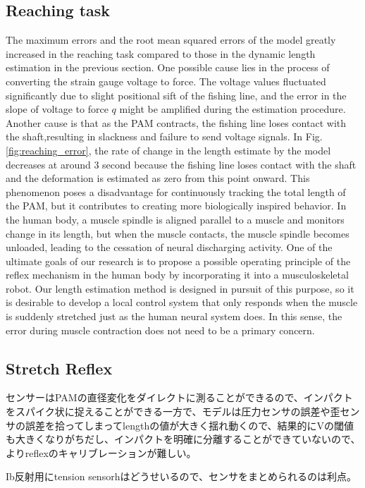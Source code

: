 \subsection{Reaching task}
The maximum errors and the root mean squared errors of the model greatly increased in the reaching task compared to those in the dynamic length estimation in the previous section. One possible cause lies in the process of converting the strain gauge voltage to force. The voltage values fluctuated significantly due to slight positional sift of the fishing line, and the error in the slope of voltage to force $q$ might be amplified during the estimation procedure. Another cause is that as the PAM contracts, the fishing line loses contact with the shaft,resulting in slackness and failure to send voltage signals. In Fig.\ref{fig:reaching_error}, the rate of change in the length estimate by the model decreases at around 3 second because the fishing line loses contact with the shaft and the deformation is estimated as zero from this point onward. This phenomenon poses a disadvantage for continuously tracking the total length of the PAM, but it contributes to creating more biologically inspired behavior. In the human body, a muscle spindle is aligned parallel to a muscle and monitors change in its length, but when the muscle contacts, the muscle spindle becomes unloaded, leading to the cessation of neural discharging activity\cite{spindle}. One of the ultimate goals of our research is to propose a possible operating principle of the reflex mechanism in the human body by incorporating it into a musculoskeletal robot. Our length estimation method is designed in pursuit of this purpose, so it is desirable to develop a local control system that only responds when the muscle is suddenly stretched just as the human neural system does. In this sense, the error during muscle contraction does not need to be a primary concern.


\subsection{Stretch Reflex}
センサーはPAMの直径変化をダイレクトに測ることができるので、インパクトをスパイク状に捉えることができる一方で、モデルは圧力センサの誤差や歪センサの誤差を拾ってしまってlengthの値が大きく揺れ動くので、結果的にVの閾値も大きくなりがちだし、インパクトを明確に分離することができていないので、よりreflexのキャリブレーションが難しい。

Ib反射用にtension sensorhはどうせいるので、センサをまとめられるのは利点。



